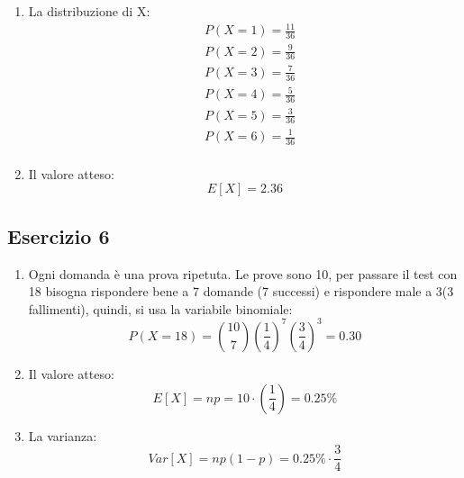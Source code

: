 \documentclass[12pt]{article}
\begin{document}
\begin{enumerate}
    \item La distribuzione di X:
    \begin{align*}
        &P(X = 1) = \frac{11}{36} \\
        &P(X = 2) = \frac{9}{36} \\
        &P(X = 3) = \frac{7}{36} \\
        &P(X = 4) = \frac{5}{36} \\
        &P(X = 5) = \frac{3}{36} \\
        &P(X = 6) = \frac{1}{36} \\
    \end{align*}
    \item Il valore atteso: 
    \[
    E[X] = 2.36    
    \]
\end{enumerate}

\subsection*{Esercizio 6}
\begin{enumerate}
    \item Ogni domanda è una prova ripetuta. Le prove sono 10, per passare il test con 18
    bisogna rispondere bene a 7 domande (7 successi) e rispondere male a 3(3 fallimenti), quindi, si 
    usa la variabile binomiale:
    \[
    P(X=18) = \binom{10}{7}\left(\frac{1}{4}\right)^7\left(\frac{3}{4}\right)^3 = 0.30%
    \]
    \item Il valore atteso:
    \[
    E[X] = np = 10\cdot \left(\frac{1}{4}\right) = 0.25 \%    
    \]
    \item La varianza:
    \[
    Var[X] = np(1-p) = 0.25\% \cdot \frac{3}{4}    
    \]    
\end{enumerate}
\end{document}
